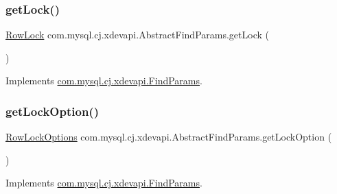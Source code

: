 \mbox{\label{classcom_1_1mysql_1_1cj_1_1xdevapi_1_1_abstract_find_params_ab7fd8c9c27d43e696a0c0bdfc207efba}} 
\subsubsection{\texorpdfstring{get\+Lock()}{getLock()}}
{\footnotesize\ttfamily \mbox{\hyperlink{enumcom_1_1mysql_1_1cj_1_1xdevapi_1_1_find_params_1_1_row_lock}{Row\+Lock}} com.\+mysql.\+cj.\+xdevapi.\+Abstract\+Find\+Params.\+get\+Lock (\begin{DoxyParamCaption}{ }\end{DoxyParamCaption})}



Implements \mbox{\hyperlink{interfacecom_1_1mysql_1_1cj_1_1xdevapi_1_1_find_params_a4b415ce43977c05c58ed209b5d200c27}{com.\+mysql.\+cj.\+xdevapi.\+Find\+Params}}.

\mbox{\label{classcom_1_1mysql_1_1cj_1_1xdevapi_1_1_abstract_find_params_aca952c3798af9960461b683aee46117e}} 
\subsubsection{\texorpdfstring{get\+Lock\+Option()}{getLockOption()}}
{\footnotesize\ttfamily \mbox{\hyperlink{enumcom_1_1mysql_1_1cj_1_1xdevapi_1_1_find_params_1_1_row_lock_options}{Row\+Lock\+Options}} com.\+mysql.\+cj.\+xdevapi.\+Abstract\+Find\+Params.\+get\+Lock\+Option (\begin{DoxyParamCaption}{ }\end{DoxyParamCaption})}



Implements \mbox{\hyperlink{interfacecom_1_1mysql_1_1cj_1_1xdevapi_1_1_find_params_a8e6ab7c549b8fd7427416bf908c7ab2e}{com.\+mysql.\+cj.\+xdevapi.\+Find\+Params}}.

